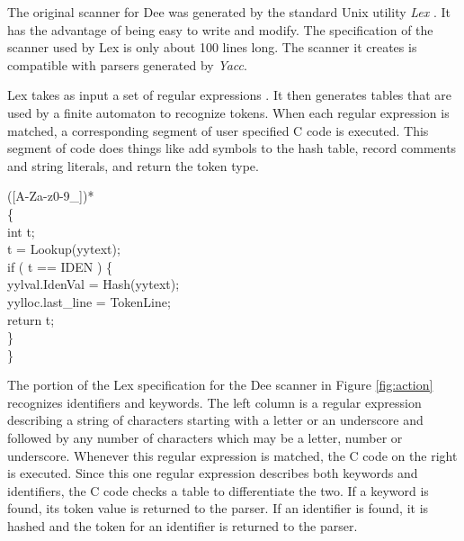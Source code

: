 The original scanner for Dee was generated by the standard Unix
utility {\em Lex} \cite{Lesk75}.  It has the advantage of being easy
to write and modify.  The specification of the scanner used by Lex is
only about 100 lines long.  The scanner it creates is compatible with
parsers generated by {\em Yacc}.

Lex takes as input a set of regular expressions \cite{Aho86,Fisher88}.
It then generates tables that are used by a finite automaton to
recognize tokens.  When each regular expression is matched, a
corresponding segment of user specified C code is executed.  This
segment of code does things like add symbols to the hash table, record
comments and string literals, and return the token type.

\begin{shortfigure}
\begin{prog}
[A-Za-z\_]([A-Za-z0-9\_])*                 \\
\>\>\>   \{                                    \\
\>\>\>\>     int t;                            \\
\>\>\>\>     t = Lookup(yytext);               \\
\>\>\>\>     if ( t == IDEN ) \{               \\
\>\>\>\>\>     yylval.IdenVal = Hash(yytext);  \\
\>\>\>\>\>     yylloc.last\_line = TokenLine;  \\
\>\>\>\>\>     return t;                       \\
\>\>\>\>     \}                                \\
\>\>\>   \}
\end{prog}
\caption{A Lex regular expression and its action.}
\label{fig:action}
\end{shortfigure}

The portion of the Lex specification for the Dee scanner in Figure
\ref{fig:action} recognizes identifiers and keywords.  The left column
is a regular expression describing a string of characters starting
with a letter or an underscore and followed by any number of
characters which may be a letter, number or underscore.  Whenever this
regular expression is matched, the C code on the right is executed.
Since this one regular expression describes both keywords and
identifiers, the C code checks a table to differentiate the two.  If a
keyword is found, its token value is returned to the parser.  If an
identifier is found, it is hashed and the token for an identifier is
returned to the parser.

